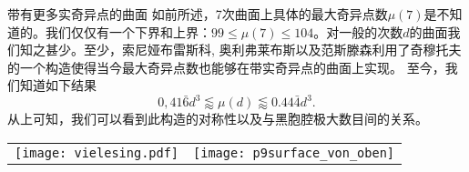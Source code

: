 ﻿\begin{surferPage}[216奇异点]{带有更多实奇异点的曲面}
如前所述，7次曲面上具体的最大奇异点数$\mu(7)$是不知道的。我们仅仅有一个下界和上界：$99\le \mu(7) \le 104$。对一般的次数$d$的曲面我们知之甚少。至少，索尼娅布雷斯科, 奥利弗莱布斯以及范斯滕森利用了奇穆托夫的一个构造使得当今最大奇异点数也能够在带实奇异点的曲面上实现。
至今，我们知道如下结果\[0,41\bar{6}d^3 \lessapprox \mu(d) \lessapprox 0.44\bar{4} d^3.\]
从上可知，我们可以看到此构造的对称性以及与黑胞腔极大数目间的关系。
 \begin{center}
      \begin{tabular}{c@{\qquad}c}
        \texttt{[image: vielesing.pdf]}
        &
        \texttt{[image: p9surface\_von\_oben]}
      \end{tabular}
    \end{center}
\end{surferPage}
